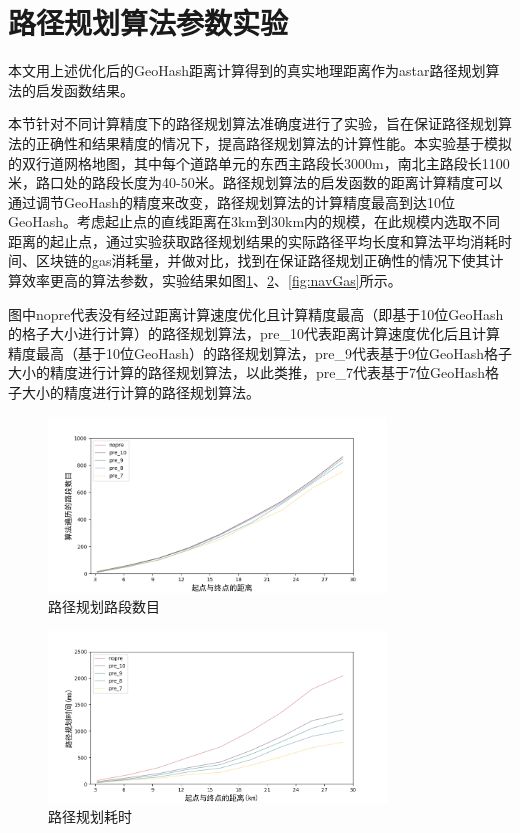 \section{路径规划算法参数实验}
本文用上述优化后的GeoHash距离计算得到的真实地理距离作为astar路径规划算法的启发函数结果。

本节针对不同计算精度下的路径规划算法准确度进行了实验，旨在保证路径规划算法的正确性和结果精度的情况下，提高路径规划算法的计算性能。本实验基于模拟的双行道网格地图，其中每个道路单元的东西主路段长3000m，南北主路段长1100米，路口处的路段长度为40-50米。路径规划算法的启发函数的距离计算精度可以通过调节GeoHash的精度来改变，路径规划算法的计算精度最高到达10位GeoHash。考虑起止点的直线距离在3km到30km内的规模，在此规模内选取不同距离的起止点，通过实验获取路径规划结果的实际路径平均长度和算法平均消耗时间、区块链的gas消耗量，并做对比，找到在保证路径规划正确性的情况下使其计算效率更高的算法参数，实验结果如图\ref{fig:navRoads}、\ref{fig:navTime}、\ref{fig:navGas}所示。

图中nopre代表没有经过距离计算速度优化且计算精度最高（即基于10位GeoHash的格子大小进行计算）的路径规划算法，pre\_10代表距离计算速度优化后且计算精度最高（基于10位GeoHash）的路径规划算法，pre\_9代表基于9位GeoHash格子大小的精度进行计算的路径规划算法，以此类推，pre\_7代表基于7位GeoHash格子大小的精度进行计算的路径规划算法。

\begin{figure}[h]
  \centering
  \includegraphics[height=0.3\textheight,width=0.8\textwidth]{figures/路径规划路段数目}
  \caption{路径规划路段数目}\label{fig:navRoads}
\end{figure}

\begin{figure}[h]
  \centering
  \includegraphics[height=0.3\textheight,width=0.8\textwidth]{figures/路径规划耗时}
  \caption{路径规划耗时}\label{fig:navTime}
\end{figure}

